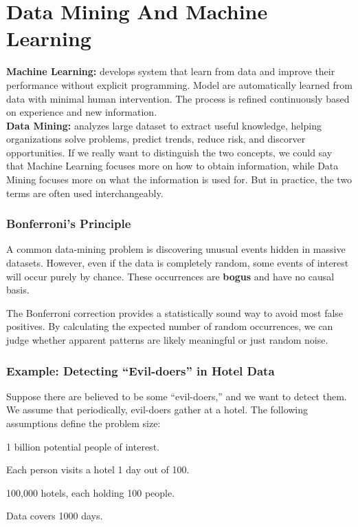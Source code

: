 \chapter{Data Mining And Machine Learning}


    \textbf{Machine Learning:} develops system that learn from data and improve their performance without explicit programming. Model are automatically learned from data with minimal human intervention. The process is refined continuously based on experience and new information.\\
    \textbf{Data Mining:} analyzes large dataset to extract useful knowledge, helping organizations solve problems, predict trends, reduce risk, and discorver opportunities.
    If we really want to distinguish the two concepts, we could say that Machine Learning focuses more on how to obtain information, while Data Mining focuses more on what the information is used for.
    But in practice, the two terms are often used interchangeably.



\subsection{Bonferroni’s Principle}

A common data-mining problem is discovering unusual events hidden in massive datasets. However, even if the data is completely random, some events of interest will occur purely by chance. These occurrences are \textbf{bogus} and have no causal basis.  

The Bonferroni correction provides a statistically sound way to avoid most false positives. By calculating the expected number of random occurrences, we can judge whether apparent patterns are likely meaningful or just random noise.  


\subsection{Example: Detecting ``Evil-doers'' in Hotel Data}

Suppose there are believed to be some ``evil-doers,'' and we want to detect them. We assume that periodically, evil-doers gather at a hotel. The following assumptions define the problem size:
\begin{compactitemize}
    \item 1 billion potential people of interest.
    \item Each person visits a hotel 1 day out of 100.
    \item 100,000 hotels, each holding 100 people.
    \item Data covers 1000 days.
\end{compactitemize}

